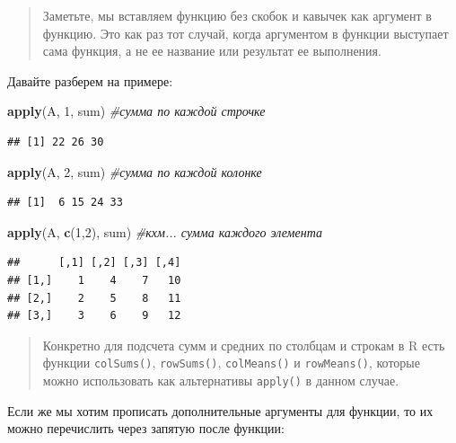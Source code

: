 \documentclass[
]{book}
\newenvironment{Shaded}{\begin{snugshade}}{\end{snugshade}}
\newcommand{\CommentTok}[1]{\textcolor[rgb]{0.56,0.35,0.01}{\textit{#1}}}
\newcommand{\DecValTok}[1]{\textcolor[rgb]{0.00,0.00,0.81}{#1}}
\newcommand{\KeywordTok}[1]{\textcolor[rgb]{0.13,0.29,0.53}{\textbf{#1}}}
\newcommand{\NormalTok}[1]{#1}
\begin{document}
\begin{quote}
Заметьте, мы вставляем функцию без скобок и кавычек как аргумент в функцию. Это как раз тот случай, когда аргументом в функции выступает сама функция, а не ее название или результат ее выполнения.
\end{quote}

Давайте разберем на примере:

\begin{Shaded}
\begin{Highlighting}[]
\KeywordTok{apply}\NormalTok{(A, }\DecValTok{1}\NormalTok{, sum) }\CommentTok{#сумма по каждой строчке}
\end{Highlighting}
\end{Shaded}

\begin{verbatim}
## [1] 22 26 30
\end{verbatim}

\begin{Shaded}
\begin{Highlighting}[]
\KeywordTok{apply}\NormalTok{(A, }\DecValTok{2}\NormalTok{, sum) }\CommentTok{#сумма по каждой колонке}
\end{Highlighting}
\end{Shaded}

\begin{verbatim}
## [1]  6 15 24 33
\end{verbatim}

\begin{Shaded}
\begin{Highlighting}[]
\KeywordTok{apply}\NormalTok{(A, }\KeywordTok{c}\NormalTok{(}\DecValTok{1}\NormalTok{,}\DecValTok{2}\NormalTok{), sum) }\CommentTok{#кхм... сумма каждого элемента}
\end{Highlighting}
\end{Shaded}

\begin{verbatim}
##      [,1] [,2] [,3] [,4]
## [1,]    1    4    7   10
## [2,]    2    5    8   11
## [3,]    3    6    9   12
\end{verbatim}

\begin{quote}
Конкретно для подсчета сумм и средних по столбцам и строкам в R есть функции \texttt{colSums()}, \texttt{rowSums()}, \texttt{colMeans()} и \texttt{rowMeans()}, которые можно использовать как альтернативы \texttt{apply()} в данном случае.
\end{quote}

Если же мы хотим прописать дополнительные аргументы для функции, то их можно перечислить через запятую после функции:
\end{document}
